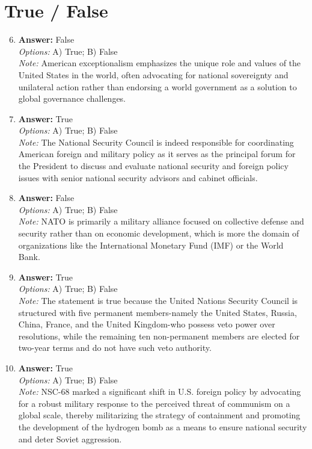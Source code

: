 \documentclass[12pt]{article}
\begin{document}
\section*{True / False}
\begin{enumerate}[label=\arabic*.]
\setcounter{enumi}{5}
\item \textbf{Answer:} False
\\ \textit{Options:} A) True; B) False
\\ \textit{Note:} American exceptionalism emphasizes the unique role and values of the United States in the world, often advocating for national sovereignty and unilateral action rather than endorsing a world government as a solution to global governance challenges.
\item \textbf{Answer:} True
\\ \textit{Options:} A) True; B) False
\\ \textit{Note:} The National Security Council is indeed responsible for coordinating American foreign and military policy as it serves as the principal forum for the President to discuss and evaluate national security and foreign policy issues with senior national security advisors and cabinet officials.
\item \textbf{Answer:} False
\\ \textit{Options:} A) True; B) False
\\ \textit{Note:} NATO is primarily a military alliance focused on collective defense and security rather than on economic development, which is more the domain of organizations like the International Monetary Fund (IMF) or the World Bank.
\item \textbf{Answer:} True
\\ \textit{Options:} A) True; B) False
\\ \textit{Note:} The statement is true because the United Nations Security Council is structured with five permanent members-namely the United States, Russia, China, France, and the United Kingdom-who possess veto power over resolutions, while the remaining ten non-permanent members are elected for two-year terms and do not have such veto authority.
\item \textbf{Answer:} True
\\ \textit{Options:} A) True; B) False
\\ \textit{Note:} NSC-68 marked a significant shift in U.S. foreign policy by advocating for a robust military response to the perceived threat of communism on a global scale, thereby militarizing the strategy of containment and promoting the development of the hydrogen bomb as a means to ensure national security and deter Soviet aggression.
\end{enumerate}
\end{document}
